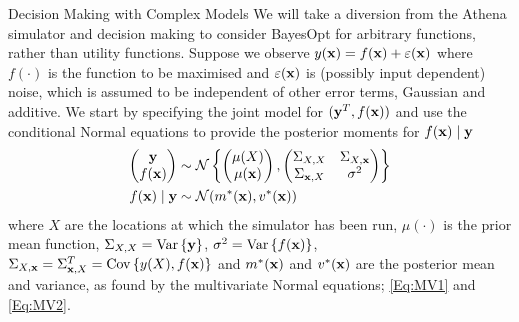 \begin{chapter}{Decision Making with Complex Models \label{Chap:optimisation}}
We will take a diversion from the Athena simulator and decision making to consider BayesOpt for arbitrary functions, rather than utility functions. Suppose we observe $y(\mathbf{x}) = f(\mathbf{x}) + \varepsilon(\mathbf{x})$ where $f(\cdot)$ is the function to be maximised and $\varepsilon(\mathbf{x})$ is (possibly input dependent) noise, which is assumed to be independent of other error terms, Gaussian and additive. We start by specifying the joint model for $(\mathbf{y}^T, f(\mathbf{x}))$ and use the conditional Normal equations to provide the posterior moments for $f(\mathbf{x}) \mid \mathbf{y}$
\begin{align}
 \begin{pmatrix} \mathbf{y} \\ f(\mathbf{x}) \end{pmatrix}
  &\sim \mathcal{N} \left\{
  \begin{pmatrix} \mu(X) \\ \mu(\mathbf{x}) \end{pmatrix}, \begin{pmatrix} \Sigma_{X, X} & \Sigma_{X, \mathbf{x}} \\ \Sigma_{\mathbf{x}, X} & \sigma^2 \end{pmatrix}
  \right\} \\
  f(\mathbf{x}) \mid \mathbf{y} &\sim \mathcal{N}(m^{*}(\mathbf{x}), v^{*}(\mathbf{x}) )
\end{align}
where $X$ are the locations at which the simulator has been run, $\mu(\cdot)$ is the prior mean function, $\Sigma_{X, X} = \mathrm{Var}\,\{\mathbf{y}\}$, $\sigma^2 = \mathrm{Var}\,\{f(\mathbf{x})\}$, $\Sigma_{X, \mathbf{x}} = \Sigma_{\mathbf{x}, X}^T = \mathrm{Cov}\,\{y(X), f(\mathbf{x})\}$ and $m^{*}(\mathbf{x})$ and $v^{*}(\mathbf{x})$ are the posterior mean and variance, as found by the multivariate Normal equations; \cref{Eq:MV1} and \cref{Eq:MV2}.

\end{chapter}
